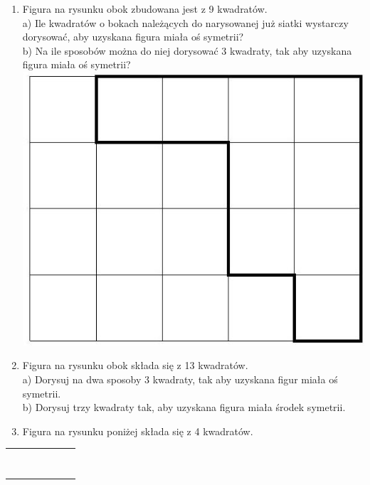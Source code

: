 \documentclass[10pt]{article}
\begin{document}
\begin{enumerate}
  \item Figura na rysunku obok zbudowana jest z 9 kwadratów.\\
a) Ile kwadratów o bokach należących do narysowanej już siatki wystarczy dorysować, aby uzyskana figura miała oś symetrii?\\
b) Na ile sposobów można do niej dorysować 3 kwadraty, tak aby uzyskana figura miała oś symetrii?\\
\includegraphics[max width=\textwidth, center]{2024_11_21_e9b4faa005d5be2cc318g-155(2)}
  \item Figura na rysunku obok składa się z 13 kwadratów.\\
a) Dorysuj na dwa sposoby 3 kwadraty, tak aby uzyskana figur miała oś symetrii.\\
b) Dorysuj trzy kwadraty tak, aby uzyskana figura miała środek symetrii.
  \item Figura na rysunku poniżej składa się z 4 kwadratów.
\end{enumerate}

\begin{center}
\begin{tabular}{|l|l|l|l|l|l|l|}
\hline
 &  &  &  &  &  &  \\
\hline
 &  &  &  &  &  &  \\
\hline
 &  &  &  &  &  &  \\
\hline
 &  &  &  &  &  &  \\
\hline
 &  &  &  &  &  &  \\
\hline
 &  &  &  &  &  &  \\
\hline
 &  &  &  &  &  &  \\
\hline
 &  &  &  &  &  &  \\
\hline
 &  &  &  &  &  &  \\
\hline
\end{tabular}
\end{center}
\end{document}
